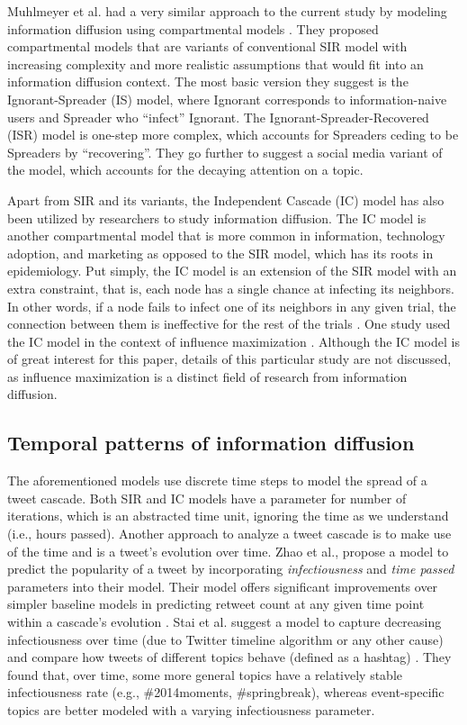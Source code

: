 \documentclass[11pt,a4paper]{article}
\begin{document}
    Muhlmeyer et al. had a very similar approach to the current study by modeling information diffusion using compartmental models \cite{muhlmeyer_modeling_2020}. They proposed compartmental models that are variants of conventional SIR model with increasing complexity and more realistic assumptions that would fit into an information diffusion context. The most basic version they suggest is the Ignorant-Spreader (IS) model, where Ignorant corresponds to information-naive users and Spreader who “infect” Ignorant. The Ignorant-Spreader-Recovered (ISR) model is one-step more complex, which accounts for Spreaders ceding to be Spreaders by “recovering”. They go further to suggest a social media variant of the model, which accounts for the decaying attention on a topic.
    
    Apart from SIR and its variants, the Independent Cascade (IC) model has also been utilized by researchers to study information diffusion. The IC model is another compartmental model that is more common in information, technology adoption, and marketing as opposed to the SIR model, which has its roots in epidemiology. Put simply, the IC model is an extension of the SIR model with an extra constraint, that is, each node has a single chance at infecting its neighbors. In other words, if a node fails to infect one of its neighbors in any given trial, the connection between them is ineffective for the rest of the trials \cite{kempe_maximizing_2003}. One study used the IC model in the context of influence maximization \cite{kim_study_2015}. Although the IC model is of great interest for this paper, details of this particular study are not discussed, as influence maximization is a distinct field of research from information diffusion.
    
    \subsection{Temporal patterns of information diffusion}
    The aforementioned models use discrete time steps to model the spread of a tweet cascade. Both SIR and IC models have a parameter for number of iterations, which is an abstracted time unit, ignoring the time as we understand (i.e., hours passed). Another approach to analyze a tweet cascade is to make use of the time and is a tweet's evolution over time. Zhao et al., propose a model to predict the popularity of a tweet by incorporating \textit{infectiousness} and \textit{time passed} parameters into their model. Their model offers significant improvements over simpler baseline models in predicting retweet count at any given time point within a cascade's evolution \cite{zhao_seismic_2015}. Stai et al. suggest a model to capture decreasing infectiousness over time (due to Twitter timeline algorithm or any other cause) and compare how tweets of different topics behave (defined as a hashtag) \cite{stai_temporal_2018}. They found that, over time, some more general topics have a relatively stable infectiousness rate (e.g., \#2014moments, \#springbreak), whereas event-specific topics are better modeled with a varying infectiousness parameter.
\end{document}

